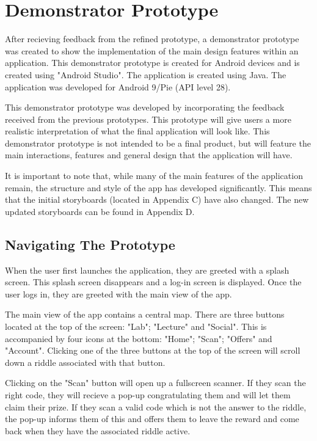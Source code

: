 \documentclass[10pt,twocolumn]{article} %
\begin{document}
\section*{Demonstrator Prototype}

After recieving feedback from the refined prototype, a demonstrator prototype was created to show the implementation of the main design features within an application. This demonstrator prototype is created for Android devices and is created using "Android Studio". The application is created using Java. The application was developed for Android 9/Pie (API level 28).

This demonstrator prototype was developed by incorporating the feedback received from the previous prototypes. This prototype will give users a more realistic interpretation of what the final application will look like. This demonstrator prototype is not intended to be a final product, but will feature the main interactions, features and general design that the application will have.

It is important to note that, while many of the main features of the application remain, the structure and style of the app has developed significantly. This means that the initial storyboards (located in Appendix C) have also changed. The new updated storyboards can be found in Appendix D. 
\subsection*{Navigating The Prototype}
When the user first launches the application, they are greeted with a splash screen. This splash screen disappears and a log-in screen is displayed. Once the user logs in, they are greeted with the main view of the app.

The main view of the app contains a central map. There are three buttons located at the top of the screen: "Lab"; "Lecture" and "Social". This is accompanied by four icons at the bottom: "Home";  "Scan"; "Offers" and "Account". Clicking one of the three buttons at the top of the screen will scroll down a riddle associated with that button.

Clicking on the "Scan" button will open up a fullscreen scanner. If they scan the right code, they will recieve a pop-up congratulating them and will let them claim their prize. If they scan a valid code which is not the answer to the riddle, the pop-up informs them of this and offers them to leave the reward and come back when they have the associated riddle active.
\end{document}
